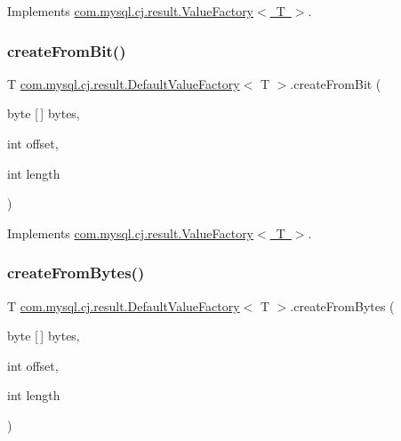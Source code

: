 Implements \mbox{\hyperlink{interfacecom_1_1mysql_1_1cj_1_1result_1_1_value_factory_a8b18f90981ce59ba61491c945b2820fe}{com.\+mysql.\+cj.\+result.\+Value\+Factory$<$ T $>$}}.

\mbox{\label{classcom_1_1mysql_1_1cj_1_1result_1_1_default_value_factory_a05b8ff2d9d1c7ff5c6f5b26188a5476c}} 
\subsubsection{\texorpdfstring{create\+From\+Bit()}{createFromBit()}}
{\footnotesize\ttfamily T \mbox{\hyperlink{classcom_1_1mysql_1_1cj_1_1result_1_1_default_value_factory}{com.\+mysql.\+cj.\+result.\+Default\+Value\+Factory}}$<$ T $>$.create\+From\+Bit (\begin{DoxyParamCaption}\item[{byte \mbox{[}$\,$\mbox{]}}]{bytes,  }\item[{int}]{offset,  }\item[{int}]{length }\end{DoxyParamCaption})}



Implements \mbox{\hyperlink{interfacecom_1_1mysql_1_1cj_1_1result_1_1_value_factory_a23ac617a66fbf713243dd67ab04d30e6}{com.\+mysql.\+cj.\+result.\+Value\+Factory$<$ T $>$}}.

\mbox{\label{classcom_1_1mysql_1_1cj_1_1result_1_1_default_value_factory_a97d2423b59241620b2e0a519c54b592a}} 
\subsubsection{\texorpdfstring{create\+From\+Bytes()}{createFromBytes()}}
{\footnotesize\ttfamily T \mbox{\hyperlink{classcom_1_1mysql_1_1cj_1_1result_1_1_default_value_factory}{com.\+mysql.\+cj.\+result.\+Default\+Value\+Factory}}$<$ T $>$.create\+From\+Bytes (\begin{DoxyParamCaption}\item[{byte \mbox{[}$\,$\mbox{]}}]{bytes,  }\item[{int}]{offset,  }\item[{int}]{length }\end{DoxyParamCaption})}



